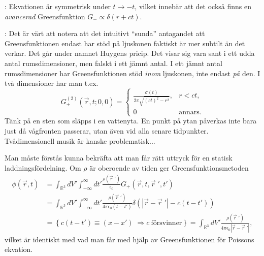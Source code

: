 \documentclass[%
oneside,                 %
final,                   %
10pt]{article}
\newcommand{\longinlinecomment}[3]{{\color{red}{\bf #1}: #2}}
\begin{document}
\noindent
\longinlinecomment{Comment 9}{ Ekvationen är symmetrisk under $t \to -t$, vilket innebär att det också finns en \emph{avancerad} Greensfunktion $G_- \propto \delta(r+ct)$. }{ Ekvationen är symmetrisk under }

\longinlinecomment{Comment 10}{ Det är värt att notera att det intuitivt ``sunda'' antagandet att Greensfunktionen endast har stöd på ljuskonen faktiskt är mer subtilt än det verkar. Det går under namnet Huygens pricip. Det visar sig vara sant i ett udda antal rumsdimensioner, men falskt i ett jämnt antal. I ett jämnt antal rumsdimensioner har Greensfunktionen stöd \emph{inom} ljuskonen, inte endast \emph{på} den. I två dimensioner har man t.ex. $$ G_+^{(2)}(\vec{r},t;0,0)= \left\{  \begin{array}{ll} \frac{\sigma(t)}{2\pi\sqrt{(ct)^2-r^2}}, & r<ct, \\ 0 & \mathrm{annars.} \end{array} \right. $$ Tänk på en sten som släpps i en vattenyta. En punkt på ytan påverkas inte bara just då vågfronten passerar, utan även vid alla senare tidpunkter. Tvådimensionell musik är kanske problematisk... }{ Det är värt att }

Man måste förstås kunna bekräfta att man får rätt uttryck för en statisk laddningsfördelning. Om $\rho$ är oberoende av tiden ger Greensfunktionsmetoden
\begin{align*}
\phi(\vec{r},t) &= 
\int_{\mathbb{R}^3}dV' \int_{-\infty}^\infty dt'
\frac{\rho(\vec{r}{\;}')}{\epsilon_0} G_+(\vec{r},t,\vec{r}{\;}',t') \\
&= \int_{\mathbb{R}^3}dV' \int_{-\infty}^\infty dt'
\frac{\rho(\vec{r}{\;}')}{4\pi\epsilon_0(t-t')} \delta(|\vec{r}-\vec{r}{\;}'|-c(t-t')) \\
&= \left\{ c(t-t') \equiv (x-x') \; \Rightarrow c \mathrm{~försvinner} \right\} =\int_{\mathbb{R}^3}dV'
\frac{\rho(\vec{r}{\;}')}{4\pi\epsilon_0|\vec{r}-\vec{r}{\;}'|},
\end{align*}
vilket är identiskt med vad man får med hjälp av Greensfunktionen för Poissons ekvation.




\printindex
\end{document}
